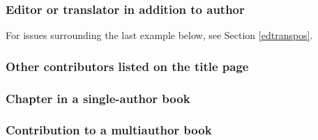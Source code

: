\documentclass[11pt,letterpaper,oneside]{article}
\begin{document}
\subsubsection{Editor or translator in addition to author}
\label{14.104}

For issues surrounding the last example below, see Section
\ref{edtranspos}.

\begin{citebib}
\item \cite{bonnefoy1995}
\item \cite{menchu1999}
\item \cite{adorno1999}
\item \cite{pound1953}
\end{citebib}

\subsubsection{Other contributors listed on the title page}
\label{14.105}

\begin{citebib}
\item \cite{chaucer1966}
\item \cite{cullen1961}
\item \cite{hayek1994}
\item \cite{prather1998}
\item \cite{williams1990}
\end{citebib}

\subsubsection{Chapter in a single-author book}

\begin{citebib}
\item \cite[211]{brower2015.8}
\item \cite{samples2006.7}
\item \cite[30-31]{samples2006.7}
\end{citebib}

\subsubsection{Contribution to a multiauthor book}
\end{document}
